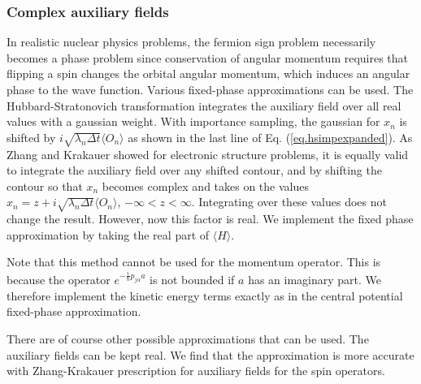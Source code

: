  \subsubsection{Complex auxiliary fields}
 In realistic nuclear physics problems,
 the fermion sign problem necessarily becomes a phase problem
 since conservation of angular momentum requires that flipping a spin changes
 the orbital angular momentum, which induces an angular phase to the wave
 function. Various fixed-phase approximations can be used. The
 Hubbard-Stratonovich transformation integrates the auxiliary field over
 all real values with a gaussian weight. With importance sampling, the
 gaussian for $x_n$ is shifted by $i\sqrt{\lambda_n \Delta t}\langle O_n\rangle$
 as shown in the last line of Eq. (\ref{eq.hsimpexpanded}).
 As Zhang and Krakauer\cite{Zhang2003} showed for electronic structure problems,
 it is equally valid to integrate the auxiliary field over any shifted
 contour, and by shifting the contour so that $x_n$ becomes complex
 and takes on the values
 $x_n  = z + i\sqrt{\lambda_n \Delta t}\langle O_n\rangle$,
 $-\infty < z < \infty$. Integrating over these values does not change the
 result. However, now this factor is real. We implement the fixed phase
 approximation by taking the real part of $\langle H \rangle$.
 
 
 Note that this method cannot be used for the momentum operator. This is
 because the operator
 $e^{-\frac{i}{\hbar} p_{j\alpha} a}$ is not bounded if $a$ has an imaginary
 part. We therefore implement the kinetic energy terms exactly as in the
 central potential fixed-phase approximation.
 
 There are of course other possible approximations that can be used. The
 auxiliary fields can be kept real. We find that the approximation is
 more accurate with Zhang-Krakauer prescription for auxiliary fields for
 the spin operators.
 
